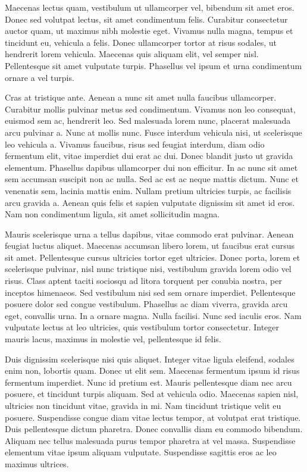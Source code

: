 \documentclass[11pt,]{article}
\begin{document}
Maecenas lectus quam, vestibulum ut ullamcorper vel, bibendum sit amet
eros. Donec sed volutpat lectus, sit amet condimentum felis. Curabitur
consectetur auctor quam, ut maximus nibh molestie eget. Vivamus nulla
magna, tempus et tincidunt eu, vehicula a felis. Donec ullamcorper
tortor at risus sodales, ut hendrerit lorem vehicula. Maecenas quis
aliquam elit, vel semper nisl. Pellentesque sit amet vulputate turpis.
Phasellus vel ipsum et urna condimentum ornare a vel turpis.

Cras at tristique ante. Aenean a nunc sit amet nulla faucibus
ullamcorper. Curabitur mollis pulvinar metus sed condimentum. Vivamus
non leo consequat, euismod sem ac, hendrerit leo. Sed malesuada lorem
nunc, placerat malesuada arcu pulvinar a. Nunc at mollis nunc. Fusce
interdum vehicula nisi, ut scelerisque leo vehicula a. Vivamus faucibus,
risus sed feugiat interdum, diam odio fermentum elit, vitae imperdiet
dui erat ac dui. Donec blandit justo ut gravida elementum. Phasellus
dapibus ullamcorper dui non efficitur. In ac nunc sit amet sem accumsan
suscipit non ac nulla. Sed ac est ac neque mattis dictum. Nunc et
venenatis sem, lacinia mattis enim. Nullam pretium ultricies turpis, ac
facilisis arcu gravida a. Aenean quis felis et sapien vulputate
dignissim sit amet id eros. Nam non condimentum ligula, sit amet
sollicitudin magna.

Mauris scelerisque urna a tellus dapibus, vitae commodo erat pulvinar.
Aenean feugiat luctus aliquet. Maecenas accumsan libero lorem, ut
faucibus erat cursus sit amet. Pellentesque cursus ultricies tortor eget
ultricies. Donec porta, lorem et scelerisque pulvinar, nisl nunc
tristique nisi, vestibulum gravida lorem odio vel risus. Class aptent
taciti sociosqu ad litora torquent per conubia nostra, per inceptos
himenaeos. Sed vestibulum nisi sed sem ornare imperdiet. Pellentesque
posuere dolor sed congue vestibulum. Phasellus ac diam viverra, gravida
arcu eget, convallis urna. In a ornare magna. Nulla facilisi. Nunc sed
iaculis eros. Nam vulputate lectus at leo ultricies, quis vestibulum
tortor consectetur. Integer mauris lacus, maximus in molestie vel,
pellentesque id felis.

Duis dignissim scelerisque nisi quis aliquet. Integer vitae ligula
eleifend, sodales enim non, lobortis quam. Donec ut elit sem. Maecenas
fermentum ipsum id risus fermentum imperdiet. Nunc id pretium est.
Mauris pellentesque diam nec arcu posuere, et tincidunt turpis aliquam.
Sed at vehicula odio. Maecenas sapien nisl, ultricies non tincidunt
vitae, gravida in mi. Nam tincidunt tristique velit eu posuere.
Suspendisse congue diam vitae lectus tempor, at volutpat erat tristique.
Duis pellentesque dictum pharetra. Donec convallis diam eu commodo
bibendum. Aliquam nec tellus malesuada purus tempor pharetra at vel
massa. Suspendisse elementum vitae ipsum aliquam vulputate. Suspendisse
sagittis eros ac leo maximus ultrices.
\end{document}
